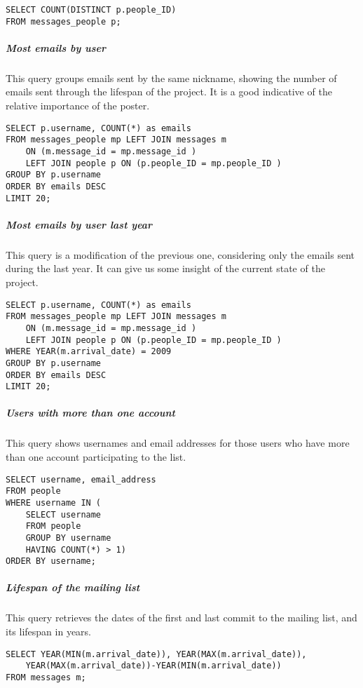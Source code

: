 \begin{verbatim}
SELECT COUNT(DISTINCT p.people_ID)
FROM messages_people p;
\end{verbatim} 

\subparagraph{Most emails by user}

This query groups emails sent by the same nickname, showing the number of emails sent through the lifespan of the project. It is a good indicative of the relative importance of the poster.

\begin{verbatim}
SELECT p.username, COUNT(*) as emails 
FROM messages_people mp LEFT JOIN messages m 
	ON (m.message_id = mp.message_id ) 
	LEFT JOIN people p ON (p.people_ID = mp.people_ID ) 
GROUP BY p.username 
ORDER BY emails DESC 
LIMIT 20;
\end{verbatim} 

\subparagraph{Most emails by user last year}

This query is a modification of the previous one, considering only the emails sent during the last year. It can give us some insight of the current state of the project.

\begin{verbatim}
SELECT p.username, COUNT(*) as emails 
FROM messages_people mp LEFT JOIN messages m 
	ON (m.message_id = mp.message_id ) 
	LEFT JOIN people p ON (p.people_ID = mp.people_ID )
WHERE YEAR(m.arrival_date) = 2009
GROUP BY p.username 
ORDER BY emails DESC 
LIMIT 20;
\end{verbatim} 

\subparagraph{Users with more than one account}

This query shows usernames and email addresses for those users who have more than one account participating to the list.

\begin{verbatim}
SELECT username, email_address 
FROM people 
WHERE username IN (
	SELECT username 
	FROM people 
	GROUP BY username 
	HAVING COUNT(*) > 1) 
ORDER BY username;
\end{verbatim}

\subparagraph{Lifespan of the mailing list}

This query retrieves the dates of the first and last commit to the mailing list, and its lifespan in years.
\begin{verbatim}
SELECT YEAR(MIN(m.arrival_date)), YEAR(MAX(m.arrival_date)), 
	YEAR(MAX(m.arrival_date))-YEAR(MIN(m.arrival_date))
FROM messages m;
\end{verbatim}

